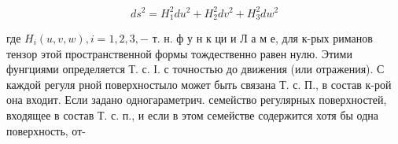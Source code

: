 \documentclass[10pt]{article}
\begin{document}
\[

d s^{2}=H_{1}^{2} d u^{2}+H_{2}^{2} d v^{2}+H_{3}^{2} d w^{2}

\]



где $H_{i}(u, v, w), i=1,2,3,-$ т. н. ф у н к ци и $Л$ а м е, для к-рых риманов тензор этой пространственной формы тождественно равен нулю. Этими фунгциями определяется Т. с. І. с точностью до движения (или отражения). С каждой регуля рной поверхностыло может быть связана Т. с. П., в состав к-рой она входит. Если задано одногараметрич. семейство регулярных поверхностей, входящее в состав Т. с. п., и если в этом семействе содержится хотя бы одна поверхность, от-
\end{document}

